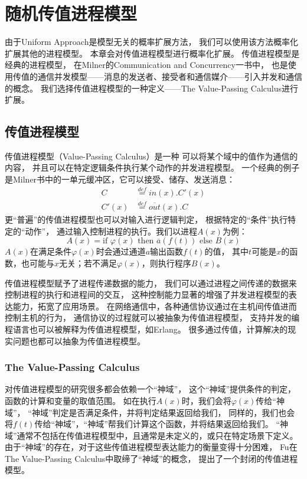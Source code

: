 
\chapter{随机传值进程模型}

由于Uniform Approach是模型无关的概率扩展方法，
我们可以使用该方法概率化扩展其他的进程模型。
本章会对传值进程模型进行概率化扩展。
传值进程模型是经典的进程模型，
在Milner的Communication and Concurrency一书中，
也是使用传值的通信并发模型——消息的发送者、接受者和通信媒介——引入并发和通信的概念。
我们选择传值进程模型的一种定义——The Value-Passing Calculus进行扩展。

\section{传值进程模型}
传值进程模型（Value-Passing Calculus）是一种
可以将某个域中的值作为通信的内容，
并且可以在特定逻辑条件执行某个动作的并发进程模型。
一个经典的例子是Milner书中的一单元缓冲区，它可以接受、储存、发送消息：
\begin{align*}
   C&\stackrel{def}{=}in(x).C'(x)\\
   C'(x)&\stackrel{def}{=}\overline{out}(x).C
\end{align*}
更“普遍”的传值进程模型也可以对输入进行逻辑判定，
根据特定的“条件”执行特定的“动作”，
通过输入控制进程的执行。我们以进程$A(x)$为例：
$$A(x)=\textrm{if }\varphi(x)\textrm{ then }\overline{a}(f(t))\textrm{ else }B(x)$$
$A(x)$在满足条件$\varphi(x)$时会通过通道$a$输出函数$f(t)$的值，
其中$t$可能是$x$的函数，也可能与$x$无关；若不满足$\varphi(x)$，则执行程序$B(x)$。

传值进程模型赋予了进程传递数据的能力，
我们可以通过进程之间传递的数据来控制进程的执行和进程间的交互，
这种控制能力显著的增强了并发进程模型的表达能力，拓宽了应用场景。
在网络通信中，各种通信协议通过在主机间传值进而控制主机的行为，
通信协议的过程就可以被抽象为传值进程模型，
支持并发的编程语言也可以被解释为传值进程模型，如Erlang。
很多通过传值，计算解决的现实问题也都可以抽象为传值进程模型。


\subsection{The Value-Passing Calculus}
对传值进程模型的研究很多都会依赖一个“神域”，
这个“神域”提供条件的判定，函数的计算和变量的取值范围。
如在执行$A(x)$时，我们会将$\varphi(x)$传给“神域”，
“神域”判定是否满足条件，并将判定结果返回给我们，
同样的，我们也会将$f(t)$传给“神域”，“神域”帮我们计算这个函数，并将结果返回给我们。
“神域”通常不包括在传值进程模型中，且通常是未定义的，或只在特定场景下定义。
由于“神域”的存在，对于这些传值进程模型表达能力的衡量变得十分困难，
Fu在The Value-Passing Calculus中取缔了“神域”的概念，
提出了一个封闭的传值进程模型。

